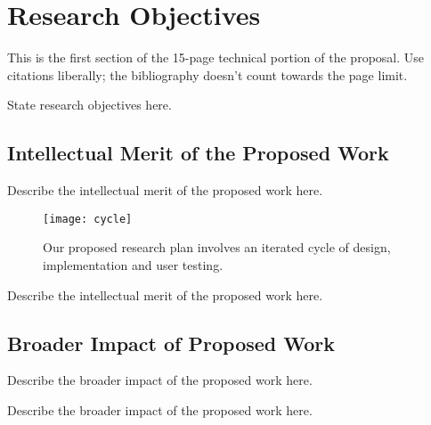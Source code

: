 \section{Research Objectives}
\label{objectives}
%
This is the first section of the 15-page technical portion of the
proposal.  Use citations liberally; the bibliography doesn't count
towards the page limit.

State research objectives here.

\subsection{Intellectual Merit of the Proposed Work}
%
Describe the intellectual merit of the proposed work here.

\begin{figure}[h]
\centerline{\mbox{\texttt{[image: cycle]}}}
\caption{Our proposed research plan involves an iterated 
         cycle of design, implementation and user testing.}
\label{fig:cycle}
\end{figure}

Describe the intellectual merit of the proposed work here.

\subsection{Broader Impact of Proposed Work}
%
Describe the broader impact of the proposed work here.

Describe the broader impact of the proposed work here.
